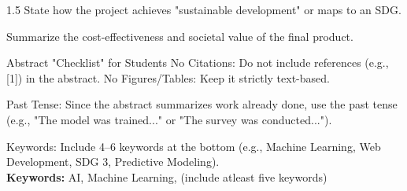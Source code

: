 \begin{spacing}{1.5}
State how the project achieves "sustainable development" or maps to an SDG.

Summarize the cost-effectiveness and societal value of the final product.

Abstract "Checklist" for Students
No Citations: Do not include references (e.g., [1]) in the abstract.
No Figures/Tables: Keep it strictly text-based.

Past Tense: Since the abstract summarizes work already done, use the past tense (e.g., "The model was trained..." or "The survey was conducted...").

Keywords: Include 4–6 keywords at the bottom (e.g., Machine Learning, Web Development, SDG 3, Predictive Modeling).
\newline	\\
\textbf{Keywords:} AI,  Machine Learning, (include atleast five keywords) 	
	
\end{spacing}